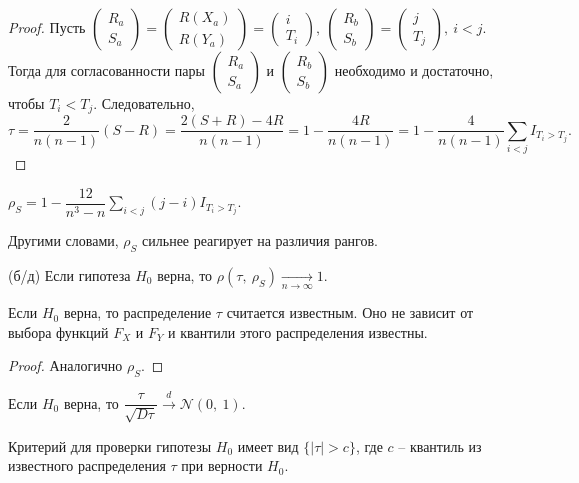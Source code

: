 \begin{proof}
    Пусть $\displaystyle \begin{pmatrix}
    R_{a}\\
    S_{a}
    \end{pmatrix} =\begin{pmatrix}
    R( X_{a})\\
    R( Y_{a})
    \end{pmatrix} =\begin{pmatrix}
    i\\
    T_{i}
    \end{pmatrix} ,\ \begin{pmatrix}
    R_{b}\\
    S_{b}
    \end{pmatrix} =\begin{pmatrix}
    j\\
    T_{j}
    \end{pmatrix} ,\ i< j$. Тогда для согласованности пары $\displaystyle \begin{pmatrix}
    R_{a}\\
    S_{a}
    \end{pmatrix}$ и $\displaystyle \begin{pmatrix}
    R_{b}\\
    S_{b}
    \end{pmatrix}$ необходимо и достаточно, чтобы $\displaystyle T_{i} < T_{j}$. Следовательно,
    \begin{equation*}
        \tau =\dfrac{2}{n( n-1)}( S-R) =\dfrac{2( S+R) -4R}{n( n-1)} =1-\dfrac{4R}{n( n-1)} =1-\dfrac{4}{n( n-1)}\sum _{i< j} I_{T_{i}  >T_{j}} .
    \end{equation*}
\end{proof}
\begin{exercise}
    $\displaystyle \rho _{S} =1-\dfrac{12}{n^{3} -n}\sum _{i< j}( j-i) I_{T_{i}  >T_{j}}$.
\end{exercise}
\begin{note}
    Другими словами, $\displaystyle \rho _{S}$ сильнее реагирует на различия рангов.
\end{note}
\begin{proposition}
    (б/д) Если гипотеза $\displaystyle H_{0}$ верна, то $\displaystyle \rho ( \tau ,\ \rho _{S})\xrightarrow[n\rightarrow \infty ]{} 1$.
\end{proposition}
\begin{proposition}
    Если $\displaystyle H_{0}$ верна, то распределение $\displaystyle \tau $ считается известным. Оно не зависит от выбора функций $\displaystyle F_{X}$ и $\displaystyle F_{Y}$ и квантили этого распределения известны.
\end{proposition}
\begin{proof}
    Аналогично $\displaystyle \rho _{S}$.
\end{proof}
\begin{proposition}
    Если $\displaystyle H_{0}$ верна, то $\displaystyle \dfrac{\tau }{\sqrt{D\tau }}\xrightarrow{d}\mathcal{N}( 0,\ 1)$.
\end{proposition}
Критерий для проверки гипотезы $\displaystyle H_{0}$ имеет вид $\displaystyle \{| \tau |  >c\}$, где $\displaystyle c$ -- квантиль из известного распределения $\displaystyle \tau $ при верности $H_0$.